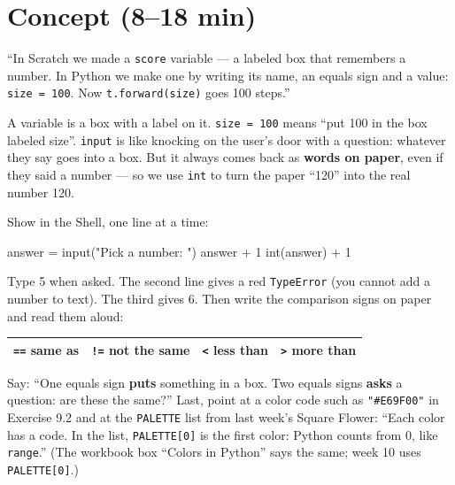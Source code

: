 \section{Concept (8--18 min)}
\begin{teacherscript}
\enquote{In Scratch we made a \texttt{score} variable --- a labeled box that remembers a number. In Python we make one by writing its name, an equals sign and a value: \texttt{size = 100}. Now \texttt{t.forward(size)} goes 100 steps.}
\end{teacherscript}
\begin{analogy}
A variable is a box with a label on it. \texttt{size = 100} means \enquote{put 100 in the box labeled size}. \texttt{input} is like knocking on the user's door with a question: whatever they say goes into a box. But it always comes back as \textbf{words on paper}, even if they said a number --- so we use \texttt{int} to turn the paper \enquote{120} into the real number 120.
\end{analogy}
Show in the Shell, one line at a time:
\begin{pycode}
answer = input("Pick a number: ")
answer + 1
int(answer) + 1
\end{pycode}
Type 5 when asked. The second line gives a red \texttt{TypeError} (you cannot add a number to text). The third gives 6. Then write the comparison signs on paper and read them aloud:
\begin{center}
\begin{tabular}{@{}llll@{}}
\toprule
\texttt{==} same as & \texttt{!=} not the same & \texttt{<} less than & \texttt{>} more than \\
\bottomrule
\end{tabular}
\end{center}
Say: \enquote{One equals sign \textbf{puts} something in a box. Two equals signs \textbf{asks} a question: are these the same?}
Last, point at a color code such as \texttt{"\#E69F00"} in Exercise 9.2 and at the \texttt{PALETTE} list from last week's Square Flower: \enquote{Each color has a code. In the list, \texttt{PALETTE[0]} is the first color: Python counts from 0, like \texttt{range}.} (The workbook box \enquote{Colors in Python} says the same; week 10 uses \texttt{PALETTE[0]}.)

